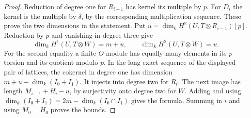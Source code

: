 \documentclass[a4paper,11pt]{article}
\theoremstyle{definition}
\theoremstyle{remark}
\numberwithin{equation}{section}
\begin{document}
\begin{proof}
Reduction of degree one for \(R_{i-1}\) has kernel its multiple
by \(p\). For \(D_i\) the kernel is the multiple by \(\delta\),
by the corresponding multiplication sequence. These prove the
two dimensions in the statement. Put
\(u=\dim_k H^2(U,T\otimes R_{i-1})[p]\).
Reduction by \(p\) and vanishing in degree three give
\[
 \dim_k H^1(U,T\otimes W)=m+u,\qquad
 \dim_k H^2(U,T\otimes W)=u.
\]
For the second equality a finite \(O\)-module has equally many
elements in its \(p\)-torsion and its quotient modulo \(p\).
In the long exact sequence of the displayed pair of lattices,
the cokernel in degree one has dimension
\(m+u-\dim_k(I_0+I_1)\). It injects into degree two for \(R_i\).
The next image has length \(M_{i-1}+H_i-u\), by surjectivity
onto degree two for \(W\). Adding and using
\(\dim_k(I_0+I_1)=2m-\dim_k(I_0\cap I_1)\) gives the formula.
Summing in \(i\) and using \(M_0=H_0\) proves the bounds.
\end{proof}
\end{document}
